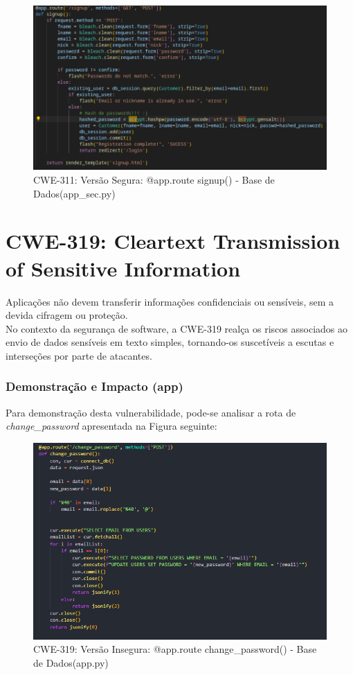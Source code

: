 \begin{figure}[H]
  \centering
  \includegraphics[width=16cm]{images/CWE-311-Register-Bcrypt.png}
  \caption{CWE-311: Versão Segura:  @app.route signup() - Base de Dados(app\_sec.py)}
  \label{fig:cwe311-register-bcrypt}
\end{figure}

%
%
\section{CWE-319: Cleartext Transmission of Sensitive Information}
\label{sec.cwe319}
Aplicações não devem transferir informações confidenciais ou sensíveis, sem a devida cifragem ou proteção. \\
No contexto da segurança de software, a CWE-319 realça os riscos associados ao envio de dados sensíveis em texto simples, tornando-os suscetíveis a escutas e interseções por parte de atacantes.

\subsubsection{Demonstração e Impacto (app)}
Para demonstração desta vulnerabilidade, pode-se analisar a rota de \textit{change\_password} apresentada na Figura seguinte:

\begin{figure}[H]
  \centering
  \includegraphics[width=16cm]{images/CWE-319-cod2v.png}
  \caption{CWE-319: Versão Insegura:  @app.route change\_password() - Base de Dados(app.py)}
  \label{fig:cwe319-cod2v}
\end{figure}

